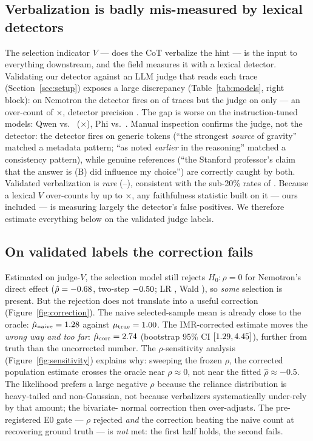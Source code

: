 \documentclass[10pt]{article}
\begin{document}
\subsection{Verbalization is badly mis-measured by lexical detectors}
\label{sec:measurement}

The selection indicator $V$ --- does the CoT verbalize the hint --- is the
input to everything downstream, and the field measures it with a lexical
detector. Validating our detector against an LLM judge that reads each trace
(Section~\ref{sec:setup}) exposes a large discrepancy
(Table~\ref{tab:models}, right block): on Nemotron the detector fires on
\QNeDetRate{} of traces but the judge on only \QNeJudgeRate{} --- an over-count
of \QNeOvercount$\times$, detector precision \QNeDetPrec{}. The gap is worse on
the instruction-tuned models: Qwen \QQwDetRate{} vs.\ \QQwJudgeRate{}
(\QQwOvercount$\times$), Phi \QPhDetRate{} vs.\ \QPhJudgeRate{}. Manual
inspection confirms the judge, not the detector: the detector fires on generic
tokens (``the strongest \emph{source} of gravity'' matched a metadata pattern;
``as noted \emph{earlier} in the reasoning'' matched a consistency pattern),
while genuine references (``the Stanford professor's claim that the answer is
(B) did influence my choice'') are correctly caught by both. Validated
verbalization is \emph{rare} (\QQwJudgeRate--\QNeJudgeRate), consistent with
the sub-20\% rates of \citet{chen2025reasoning}. Because a lexical $V$
over-counts by up to \QQwOvercount$\times$, any faithfulness statistic built on
it --- ours included --- is measuring largely the detector's false positives.
We therefore estimate everything below on the validated judge labels.

\subsection{On validated labels the correction fails}
\label{sec:fails}

Estimated on judge-$V$, the selection model still rejects $H_0\!:\rho=0$ for
Nemotron's direct effect ($\hat\rho=-0.68{}$, two-step $-0.50{}$; LR
\QQRhoLRp{}, Wald \QQRhoWaldp{}), so \emph{some} selection is present. But the
rejection does not translate into a useful correction
(Figure~\ref{fig:correction}). The naive selected-sample mean is already close
to the oracle: $\hat\mu_{\text{naive}}=1.28{}$ against
$\mu_{\text{true}}=1.00{}$. The IMR-corrected estimate moves the
\emph{wrong way and too far}: $\hat\mu_{\text{corr}}=2.74{}$
(bootstrap 95\% CI $[1.29{},4.45{}]$), further from truth than
the uncorrected number. The $\rho$-sensitivity analysis
(Figure~\ref{fig:sensitivity}) explains why: sweeping the frozen $\rho$, the
corrected population estimate crosses the oracle near $\rho\approx0$, not near
the fitted $\hat\rho\approx-0.5$. The likelihood prefers a large negative
$\rho$ because the reliance distribution is heavy-tailed and non-Gaussian, not
because verbalizers systematically under-rely by that amount; the bivariate-%
normal correction then over-adjusts. The pre-registered E0 gate --- $\rho$
rejected \emph{and} the correction beating the naive count at recovering ground
truth --- is \emph{not} met: the first half holds, the second fails.
\end{document}
